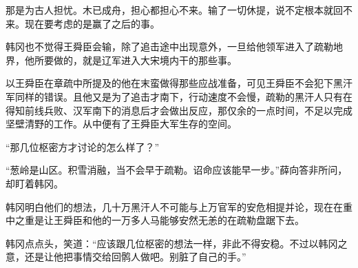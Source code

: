 那是为古人担忧。木已成舟，担心都担心不来。输了一切休提，说不定根本就回不来。现在要考虑的是赢了之后的事。

韩冈也不觉得王舜臣会输，除了追击途中出现意外，一旦给他领军进入了疏勒地界，他所要做的，就是辽军进入大宋境内干的那些事。

以王舜臣在章疏中所提及的他在末蛮做得那些应战准备，可见王舜臣不会犯下黑汗军同样的错误。且他又是为了追击才南下，行动速度不会慢，疏勒的黑汗人只有在得知前线兵败、汉军南下的消息后才会做出反应，那仅余的一点时间，不足以完成坚壁清野的工作。从中便有了王舜臣大军生存的空间。

“那几位枢密方才讨论的怎么样了？”

“葱岭是山区。积雪消融，当不会早于疏勒。诏命应该能早一步。”薛向答非所问，却盯着韩冈。

韩冈明白他们的想法，几十万黑汗人不可能与上万官军的安危相提并论，现在在重中之重是让王舜臣和他的一万多人马能够安然无恙的在疏勒盘踞下去。

韩冈点点头，笑道：“应该跟几位枢密的想法一样，非此不得安稳。不过以韩冈之意，还是让他把事情交给回鹘人做吧。别脏了自己的手。”
